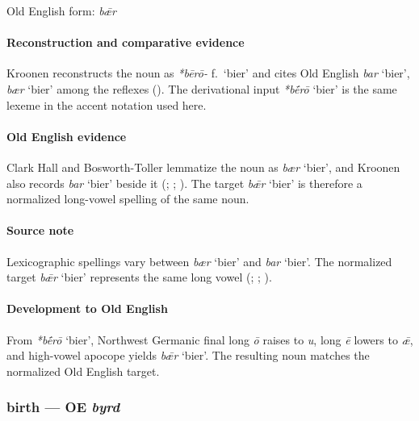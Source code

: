 \documentclass[
  british,
  a4paper,
]{article}
\providecommand{\Recon}[1]{\emph{*#1}}
\begin{document}
Old English form: \emph{bǣr}

\paragraph{Reconstruction and comparative
evidence}\label{reconstruction-and-comparative-evidence-5}

Kroonen reconstructs the noun as {\emph{*bērō-}} f.~`bier' and cites Old
English {\emph{bar}} `bier', {\emph{bær}} `bier' among the reflexes
(). The derivational input
\Recon{bḗrō} `bier' is the same lexeme in the accent notation used here.

\paragraph{Old English evidence}\label{old-english-evidence-5}

Clark Hall and Bosworth-Toller lemmatize the noun as {\emph{bær}}
`bier', and Kroonen also records {\emph{bar}} `bier' beside it
(;
;
). The target {\emph{bǣr}}
`bier' is therefore a normalized long-vowel spelling of the same noun.

\paragraph{Source note}\label{source-note}

Lexicographic spellings vary between {\emph{bær}} `bier' and
{\emph{bar}} `bier'. The normalized target {\emph{bǣr}} `bier'
represents the same long vowel (; ;
).

\paragraph{Development to Old
English}\label{development-to-old-english-5}

From \Recon{bḗrō} `bier', Northwest Germanic final long \emph{ō} raises
to \emph{u}, long \emph{ē} lowers to \emph{ǣ}, and high-vowel apocope
yields {\emph{bǣr}} `bier'. The resulting noun matches the normalized
Old English target.

\subsubsection{\texorpdfstring{birth --- OE
\emph{byrd}}{birth --- OE byrd}}\label{birth-oe-byrd}
\end{document}
